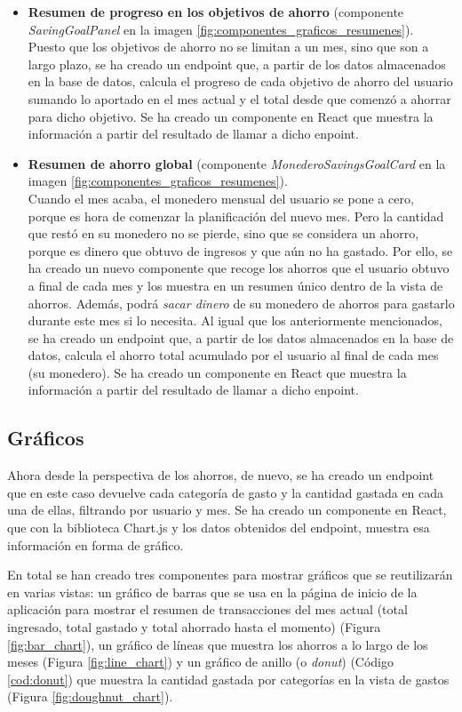 \begin{itemize}
    \item \textbf{Resumen de progreso en los objetivos de ahorro} (componente \textit{SavingGoalPanel} en la imagen \ref{fig:componentes_graficos_resumenes}). \\
    Puesto que los objetivos de ahorro no se limitan a un mes, sino que son a largo plazo, se ha creado un endpoint que, a partir de los datos almacenados en la base de datos, calcula el progreso de cada objetivo de ahorro del usuario sumando lo aportado en el mes actual y el total desde que comenzó a ahorrar para dicho objetivo. Se ha creado un componente en React que muestra la información a partir del resultado de llamar a dicho enpoint.
    \item \textbf{Resumen de ahorro global} (componente \textit{MonederoSavingsGoalCard} en la imagen \ref{fig:componentes_graficos_resumenes}).\\
     Cuando el mes acaba, el monedero mensual del usuario se pone a cero, porque es hora de comenzar la planificación del nuevo mes. Pero la cantidad que restó en su monedero no se pierde, sino que se considera un ahorro, porque es dinero que obtuvo de ingresos y que aún no ha gastado. Por ello, se ha creado un nuevo componente que recoge los ahorros que el usuario obtuvo a final de cada mes y los muestra en un resumen único dentro de la vista de ahorros. Además, podrá \textit{sacar dinero} de su monedero de ahorros para gastarlo durante este mes si lo necesita. Al igual que los anteriormente mencionados, se ha creado un endpoint que, a partir de los datos almacenados en la base de datos, calcula el ahorro total acumulado por el usuario al final de cada mes (su monedero). Se ha creado un componente en React que muestra la información a partir del resultado de llamar a dicho enpoint.

\end{itemize}


\subsection{Gráficos}
Ahora desde la perspectiva de los ahorros, de nuevo, se ha creado un endpoint que en este caso devuelve cada categoría de gasto y la cantidad gastada en cada una de ellas, filtrando por usuario y mes. Se ha creado un componente en React, que con la biblioteca Chart.js y los datos obtenidos del endpoint, muestra esa información en forma de gráfico.

En total se han creado tres componentes para mostrar gráficos que se reutilizarán en varias vistas: un gráfico de barras que se usa en la página de inicio de la aplicación para mostrar el resumen de transacciones del mes actual (total ingresado, total gastado y total ahorrado hasta el momento) (Figura \ref{fig:bar_chart}), un gráfico de líneas que muestra los ahorros a lo largo de los meses (Figura \ref{fig:line_chart}) y un gráfico de anillo (o \textit{donut}) (Código \ref{cod:donut}) que muestra la cantidad gastada por categorías en la vista de gastos (Figura \ref{fig:doughnut_chart}). 

